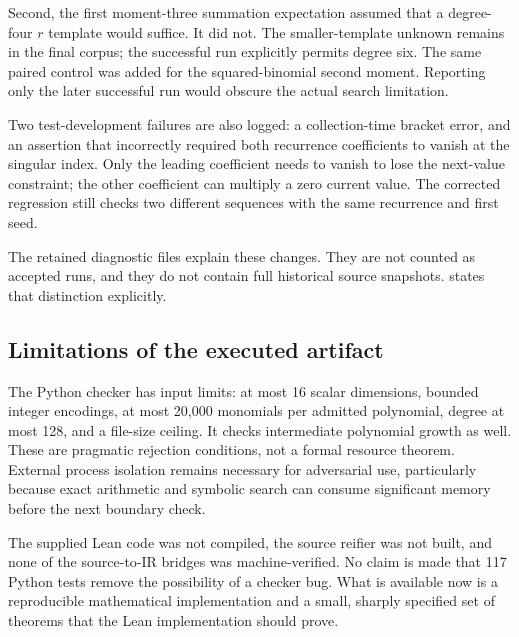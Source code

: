 Second, the first moment-three summation expectation assumed that a degree-four
$r$ template would suffice. It did not. The smaller-template unknown remains in
the final corpus; the successful run explicitly permits degree six. The same
paired control was added for the squared-binomial second moment. Reporting only
the later successful run would obscure the actual search limitation.

Two test-development failures are also logged: a collection-time bracket error,
and an assertion that incorrectly required both recurrence coefficients to
vanish at the singular index. Only the leading coefficient needs to vanish to
lose the next-value constraint; the other coefficient can multiply a zero
current value. The corrected regression still checks two different sequences
with the same recurrence and first seed.

The retained diagnostic files explain these changes. They are not counted as
accepted runs, and they do not contain full historical source snapshots.
 states that distinction explicitly.

\subsection{Limitations of the executed artifact}

The Python checker has input limits: at most 16 scalar dimensions, bounded
integer encodings, at most 20,000 monomials per admitted polynomial, degree at
most 128, and a file-size ceiling. It checks intermediate polynomial growth as
well. These are pragmatic rejection conditions, not a formal resource theorem.
External process isolation remains necessary for adversarial use, particularly
because exact arithmetic and symbolic search can consume significant memory
before the next boundary check.

The supplied Lean code was not compiled, the source reifier was not built,
and none of the source-to-IR bridges was machine-verified. No claim is made that
117 Python tests remove the possibility of a checker bug. What is available
now is a reproducible mathematical implementation and a small, sharply specified
set of theorems that the Lean implementation should prove.
